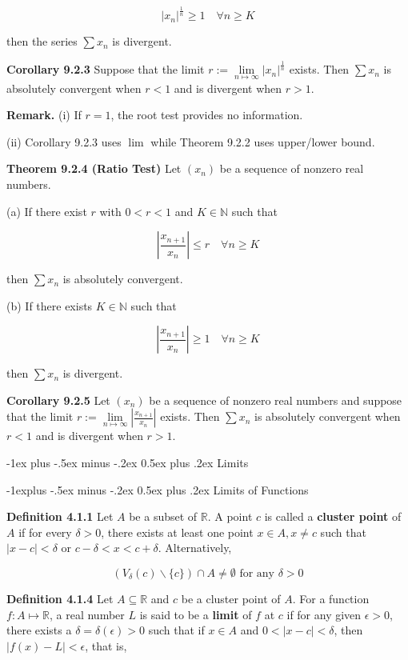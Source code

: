 \documentclass[10pt,landscape]{article}
\makeatletter
\renewcommand{\section}{\@startsection{section}{1}{0mm}%
                                {-1ex plus -.5ex minus -.2ex}%
                                {0.5ex plus .2ex}%
                                {\normalfont\large\bfseries}}
\renewcommand{\subsection}{\@startsection{subsection}{2}{0mm}%
                                {-1explus -.5ex minus -.2ex}%
                                {0.5ex plus .2ex}%
                                {\normalfont\normalsize\bfseries}}
\makeatother
\begin{document}
\begin{multicols}{4}
$$
|x_n|^{\frac{1}{n}} \geq 1 \quad \forall n \geq K
$$

then the series $\sum x_n$ is divergent.

\textbf{Corollary 9.2.3} Suppose that the limit $r := \underset{n \mapsto \infty}{\lim} |x_n|^{\frac{1}{n}}$ exists. Then $\sum x_n$ is absolutely convergent when $r < 1$ and is divergent when $r > 1$.  

\textbf{Remark.} 
(i) If $r = 1$, the root test provides no information.

(ii) Corollary 9.2.3 uses $\lim$ while Theorem 9.2.2 uses upper/lower bound.

\textbf{Theorem 9.2.4 (Ratio Test)} Let $(x_n)$ be a sequence of nonzero real numbers.

(a) If there exist $r$ with $0 < r < 1$ and $K \in \mathbb{N}$ such that

$$
|\frac{x_{n+1}}{x_n}| \leq r \quad \forall n \geq K
$$

then $\sum x_n$ is absolutely convergent.

(b) If there exists $K \in \mathbb{N}$ such that 

$$
|\frac{x_{n+1}}{x_n}| \geq 1 \quad \forall n \geq K
$$

then $\sum x_n$ is divergent.

\textbf{Corollary 9.2.5} Let $(x_n)$ be a sequence of nonzero real numbers and suppose that the limit $r := \underset{n \mapsto \infty}{\lim} |\frac{x_{n+1}}{x_n}|$ exists. Then $\sum x_n$ is absolutely convergent when $r < 1$ and is divergent when $r > 1$.

\section{Limits}

\subsection{Limits of Functions}

\textbf{Definition 4.1.1} Let $A$ be a subset of $\mathbb{R}$. A point $c$ is called a \textbf{cluster point} of $A$ if for every $\delta > 0$, there exists at least one point $x \in A, x \neq c$ such that $|x - c| < \delta$ or $c - \delta < x < c + \delta$. Alternatively,

$$
(V_{\delta}(c) \backslash \{ c \}) \cap A \neq \emptyset \text{ for any } \delta > 0
$$

\textbf{Definition 4.1.4} Let $A \subseteq \mathbb{R}$ and $c$ be a cluster point of $A$. For a function $f: A \mapsto \mathbb{R}$, a real number $L$ is said to be a \textbf{limit} of $f$ at $c$ if for any given $\epsilon > 0$, there exists a $\delta = \delta(\epsilon) > 0$ such that if $x \in A$ and $0 < |x - c| < \delta$, then $|f(x) - L| < \epsilon$, that is,


\end{multicols}
\end{document}
